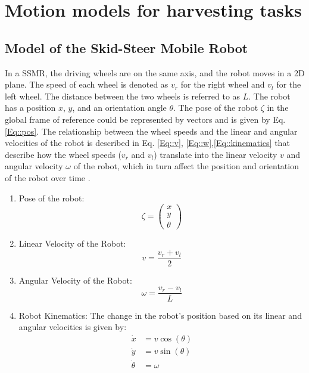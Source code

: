 \documentclass[conference]{IEEEtran}
\begin{document}
\section{Motion models for harvesting tasks}
\subsection{Model of the Skid-Steer Mobile Robot}

In a SSMR, the driving wheels are on the same axis, and the robot moves in a 2D plane. The speed of each wheel is denoted as $v_{r}$ for the right wheel and $v_{l}$ for the left wheel. The distance between the two wheels is referred to as $L$. The robot has a position $x$, $y$, and an orientation angle $\theta$. The pose of the robot $\zeta$ in the global frame of reference could be represented by vectors and is given by Eq. \ref{Eq::pos}. The relationship between the wheel speeds and the linear and angular velocities of the robot is described in Eq. \ref{Eq::v}, \ref{Eq::w},\ref{Eq::kinematics} that describe how the wheel speeds ($v_{r}$ and $v_{l}$) translate into the linear velocity $v$ and angular velocity $\omega$ of the robot, which in turn affect the position and orientation of the robot over time  \cite{Prio2019,guevara2019}.

\begin{enumerate}
    \item Pose of the robot:
    \begin{equation} \label{Eq::pos}
    \zeta = \begin{pmatrix}
        x \\
        y \\
        \theta
    \end{pmatrix}
    \end{equation}
    \item Linear Velocity of the Robot:
    \begin{equation} \label{Eq::v}
        v = \frac{v_r + v_l}{2}
    \end{equation}
   
    \item Angular Velocity of the Robot:
    \begin{equation} \label{Eq::w}
    \omega = \frac{v_r - v_l}{L}
    \end{equation}
  
    \item Robot Kinematics: The change in the robot's position based on its linear and angular velocities is given by:  
    \begin{equation} \label{Eq::kinematics}
        \begin{split}
        \dot{x} &= v \cos(\theta) \\ 
        \dot{y} &= v \sin(\theta) \\
        \dot{\theta} &= \omega
    \end{split}
    \end{equation}
\end{enumerate}
\end{document}
